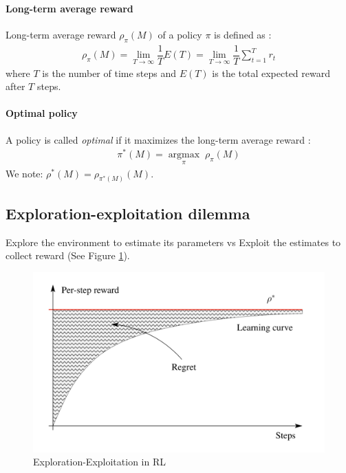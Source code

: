 \documentclass[a4paper,10pt]{article}
\newcommand{\argmax}[1]{\underset{#1}{\operatorname{argmax}}\;}
\begin{document}
\paragraph{Long-term average reward\\}
Long-term average reward $\rho_{\pi}(M)$ of a policy $\pi$ is defined as : 
\begin{align*}
\rho_{\pi}(M) = \lim\limits_{T \rightarrow \infty} \dfrac{1}{T}E(T) = \lim\limits_{T \rightarrow \infty} \dfrac{1}{T}\sum\limits_{t = 1}^{T} r_t
\end{align*}
where $T$ is the number of time steps and 
$E(T)$ is the total expected reward after $T$ steps.

\paragraph{Optimal policy\\}
A policy is called \textit{optimal} if it maximizes the long-term average reward : 
\begin{align*}
\pi^{*}(M) =  \argmax{\pi} \rho_{\pi}(M)
\end{align*}
We note: $\rho^{*}(M) = \rho_{\pi^{*}(M)}(M)$.

\subsection{Exploration-exploitation dilemma}
Explore the environment to estimate its parameters vs Exploit the estimates to collect reward (See Figure \ref{regret}).

\begin{figure}[h]
	\includegraphics[width=\textwidth]{regret.png}
   \caption{Exploration-Exploitation in RL}
   \label{regret}
\end{figure}
\end{document}
